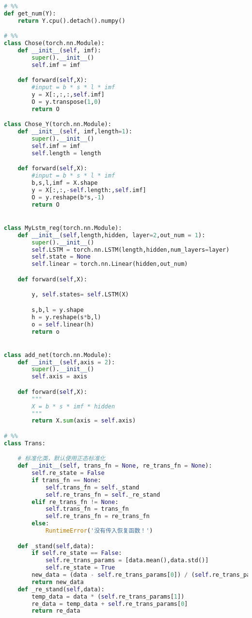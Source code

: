 \begin{appendices}
\begin{lstlisting}[language=python]
# %%
def get_num(Y):
    return Y.cpu().detach().numpy()

# %%
class Chose(torch.nn.Module):
    def __init__(self, imf):
        super().__init__()
        self.imf = imf

    def forward(self,X):
        #input = b * s * l * imf
        y = X[:,:,:,self.imf]
        O = y.transpose(1,0)
        return O

class Chose_Y(torch.nn.Module):
    def __init__(self, imf,length=1):
        super().__init__()
        self.imf = imf
        self.length = length

    def forward(self,X):
        #input = b * s * l * imf
        b,s,l,imf = X.shape
        y = X[:,:,-self.length:,self.imf]
        O = y.reshape(b*s,-1)
        return O


class MyLstm_reg(torch.nn.Module):
    def __init__(self,length,hidden, layer=2,out_num = 1):
        super().__init__()
        self.LSTM = torch.nn.LSTM(length,hidden,num_layers=layer)
        self.state = None
        self.linear = torch.nn.Linear(hidden,out_num)

    def forward(self,X):

        y, self.states= self.LSTM(X)

        s,b,l = y.shape
        h = y.reshape(s*b,l)
        o = self.linear(h)
        return o


class add_net(torch.nn.Module):
    def __init__(self,axis = 2):
        super().__init__()
        self.axis = axis

    def forward(self,X):
        """
        X = b * s * imf * hidden
        """
        return X.sum(axis = self.axis)

# %%
class Trans:

    # 标准化类，默认使用正态标准化
    def __init__(self, trans_fn = None, re_trans_fn = None):
        self.re_state = False
        if trans_fn == None:
            self.trans_fn = self._stand
            self.re_trans_fn = self._re_stand
        elif re_trans_fn != None:
            self.trans_fn = trans_fn
            self.re_trans_fn = re_trans_fn
        else:
            RuntimeError('没有传入恢复函数！')

    def _stand(self,data):
        if self.re_state == False:
            self.re_trans_params = [data.mean(),data.std()]
            self.re_state = True
        new_data = (data - self.re_trans_params[0]) / (self.re_trans_params[1])
        return new_data
    def _re_stand(self,data):
        temp_data = data * (self.re_trans_params[1])
        re_data = temp_data + self.re_trans_params[0]
        return re_data


\end{lstlisting}
\end{appendices}
